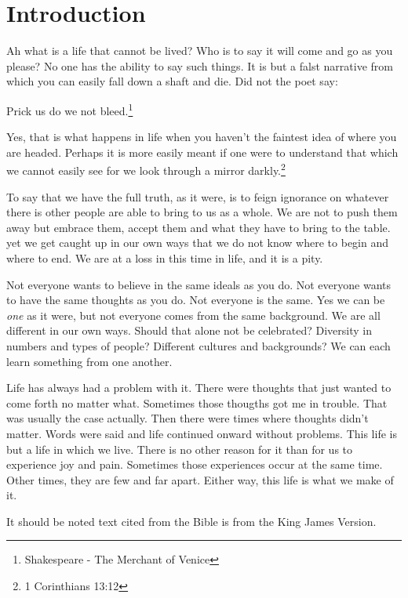 \section*{Introduction}

Ah what is a life that cannot be lived? Who is to say it will come and go as you
please? No one has the ability to say such things. It is but a falst narrative
from which you can easily fall down a shaft and die. Did not the poet say:

\begin{displayquote}
Prick us do we not bleed.\footnote{Shakespeare - The Merchant of Venice}
\end{displayquote}

Yes, that is what happens in life when you haven't the faintest idea of where
you are headed. Perhaps it is more easily meant if one were to understand that
which we cannot easily see for we look through a mirror 
darkly.\footnote{1 Corinthians 13:12}

To say that we have the full truth, as it were, is to feign ignorance on 
whatever there is other people are able to bring to us as a whole. We are not to 
push them away but embrace them, accept them and what they have to bring to the
table. yet we get caught up in our own ways that we do not know where to begin
and where to end. We are at a loss in this time in life, and it is a pity.

Not everyone wants to believe in the same ideals as you do. Not everyone wants
to have the same thoughts as you do. Not everyone is the same. Yes we can be 
\textit{one} as it were, but not everyone comes from the same background. We 
are all different in our own ways. Should that alone not be celebrated?
Diversity in numbers and types of people? Different cultures and backgrounds? We
can each learn something from one another.

Life has always had a problem with it. There were thoughts that just wanted to
come forth no matter what. Sometimes those thougths got me in trouble. That was
usually the case actually. Then there were times where thoughts didn't matter.
Words were said and life continued onward without problems. This life is but a
life in which we live. There is no other reason for it than for us to experience
joy and pain. Sometimes those experiences occur at the same time. Other times,
they are few and far apart. Either way, this life is what we make of it.

It should be noted text cited from the Bible is from the King James Version.